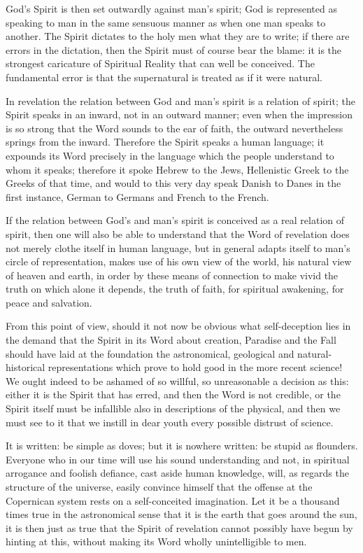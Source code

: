 \documentclass[12pt,a4paper,openany]{book}
\newcommand{\opage}[1]{\marginnote{\footnotesize\textit{[#1]}}}
\begin{document}
God's Spirit is then set outwardly against man's
spirit; God is represented as speaking to man in the same
\setcounter{footnote}{0}%
\opage{317}sensuous manner as when one man speaks to
another. The Spirit dictates to the holy men what they
are to write; if there are errors in the dictation, then the Spirit
must of course bear the blame: it is the strongest caricature
of Spiritual Reality that can well be conceived.
The fundamental error is that the supernatural is treated
as if it were natural.

In revelation the relation between God and man's
spirit is a relation of spirit; the Spirit speaks in an inward,
not in an outward manner; even when the impression
is so strong that the Word sounds to the ear of faith, the outward
nevertheless springs from the inward. Therefore the Spirit speaks
a human language; it expounds its Word precisely in
the language which the people understand to whom it
speaks; therefore it spoke Hebrew to the Jews, Hellenistic
Greek to the Greeks of that time, and would to this very day
speak Danish to Danes in the first instance, German to Germans
and French to the French.

If the relation between God's and man's
spirit is conceived as a real relation of spirit, then one will also
be able to understand that the Word of revelation does not merely clothe
itself in human language, but in general adapts
itself to man's circle of representation, makes use of
his own view of the world, his natural view of
heaven and earth, in order by these means of connection to
make vivid the truth on which alone it depends, %
the truth of faith, for spiritual awakening, for peace and
salvation.

From this point of view, should it not now be
obvious what self-deception lies in the demand
that the Spirit in its Word about creation, Paradise and the
\setcounter{footnote}{0}%
\opage{318}Fall should have laid at the foundation the astronomical, geological and
natural-historical representations which prove to
hold good in the more recent science! We ought indeed
to be ashamed of so willful, so unreasonable a decision
as this: either it is the Spirit that has erred, and
then the Word is not credible, or the Spirit itself must
be infallible also in descriptions of the physical, and
then we must see to it that we instill in dear youth every
possible distrust of science.

It is written: be simple as doves;
but it is nowhere written: be stupid as
flounders. Everyone who in our time will use his sound
understanding and not, in spiritual arrogance and foolish defiance,
cast aside human knowledge, will, as regards the structure
of the universe, easily convince himself that the offense
at the Copernican system rests on a
self-conceited imagination. Let it be a thousand times true
in the astronomical sense that it is the earth that goes
around the sun, it is then just as true that the Spirit of revelation
cannot possibly have begun by hinting
at this, without making its Word wholly unintelligible to
men.
\end{document}
